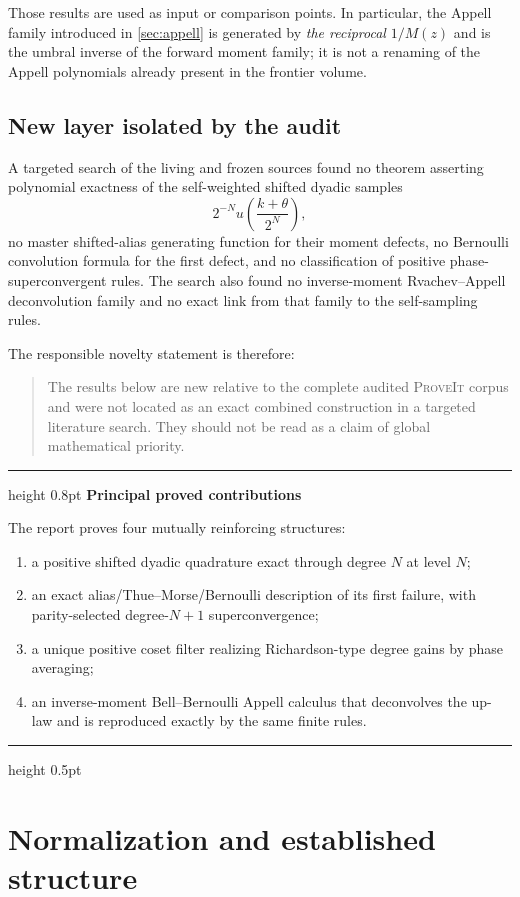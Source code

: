 \documentclass[11pt]{article}
\numberwithin{equation}{section}
\theoremstyle{definition}
\theoremstyle{remark}
\newenvironment{statusbox}[1][]
{\begin{center}\begin{minipage}{0.94\textwidth}%
\color{darkgreen}\hrule height 0.8pt\vspace{0.45em}%
\color{black}\textbf{#1}\par\smallskip}
{\vspace{0.35em}\color{darkgreen}\hrule height 0.5pt\end{minipage}\end{center}}
\newcommand{\repo}{\textsc{ProveIt}}
\begin{document}
Those results are used as input or comparison points.  In particular, the Appell family introduced in \cref{sec:appell} is generated by \emph{the reciprocal} $1/M(z)$ and is the umbral inverse of the forward moment family; it is not a renaming of the Appell polynomials already present in the frontier volume.

\subsection{New layer isolated by the audit}

A targeted search of the living and frozen sources found no theorem asserting polynomial exactness of the self-weighted shifted dyadic samples
\[
 2^{-N}u\!\left(\frac{k+\theta}{2^N}\right),
\]
no master shifted-alias generating function for their moment defects, no Bernoulli convolution formula for the first defect, and no classification of positive phase-superconvergent rules.  The search also found no inverse-moment Rvachev--Appell deconvolution family and no exact link from that family to the self-sampling rules.

The responsible novelty statement is therefore:
\begin{quote}
The results below are new relative to the complete audited \repo{} corpus and were not located as an exact combined construction in a targeted literature search.  They should not be read as a claim of global mathematical priority.
\end{quote}

\begin{statusbox}[Principal proved contributions]
The report proves four mutually reinforcing structures:
\begin{enumerate}
\item a positive shifted dyadic quadrature exact through degree $N$ at level $N$;
\item an exact alias/Thue--Morse/Bernoulli description of its first failure, with parity-selected degree-$N+1$ superconvergence;
\item a unique positive coset filter realizing Richardson-type degree gains by phase averaging;
\item an inverse-moment Bell--Bernoulli Appell calculus that deconvolves the up-law and is reproduced exactly by the same finite rules.
\end{enumerate}
\end{statusbox}

\section{Normalization and established structure}
\label{sec:background}
\end{document}
